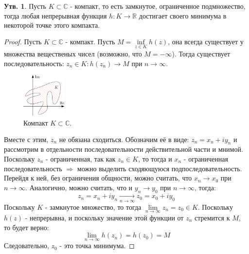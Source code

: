 \documentclass[12pt]{article}
\newcommand{\MR}{\mathbb{R}}
\newcommand{\MC}{\mathbb{C}}
\theoremstyle{definition}
\newtheorem{prop}{Утв.}
\begin{document}
\begin{prop}
	Пусть $K \subset \MC$ - компакт, то есть замкнутое, ограниченное подмножество, тогда любая непрерывная функция $h \colon K \to \MR$ достигает своего минимума в некоторой точке этого компакта.
\end{prop}
\begin{proof}
	Пусть $K \subset \MC$ - компакт. Пусть $M = \inf\limits_{z \in K} h(z)$, она всегда существует у множества вещественых чисел (возможно, что $M = -\infty$). Тогда существует последовательность: $z_n \in K \colon h(z_n) \to M$ при $n \to \infty$.
	\begin{figure}[H]
		\centering
		\includegraphics[width=0.2\textwidth]{AL1L18_3.png}
		\caption{Компакт $K \subset \MC$.}
		\label{18_3}
	\end{figure}
	Вместе с этим, $z_n$ не обязана сходиться. Обозначим её в виде: $z_n = x_n + iy_n$ и рассмотрим в отдельности последовательности действительной части и мнимой. Поскольку $z_n$ - ограниченная, так как $z_n \in K$, то тогда и $x_n$ - ограниченная последовательность $\Rightarrow$ можно выделить сходяющуюся подпоследовательность. Перейдя к ней, без ограничения общности, можно считать, что $x_n \to x_0$ при $n \to \infty$. Аналогично, можно считать, что и $y_n \to y_0$ при $n \to \infty$, тогда: 
	$$
		z_n = x_n + iy_n \xrightarrow[n\to\infty]{} z_0 = x_0 + iy_0 
	$$
	Поскольку $K$ - замкнутое множество, то тогда $\lim\limits_{n \to \infty}z_n = z_0 \in K$. Поскольку $h(z)$ - непрерывна, и поскольку значение этой функции от $z_n$ стремится к $M$, то будет верно:
	$$
		\lim\limits_{n \to \infty}h(z_n) = h(z_0) = M
	$$
	Следовательно, $z_0$ - это точка минимума.
\end{proof}
\end{document}
